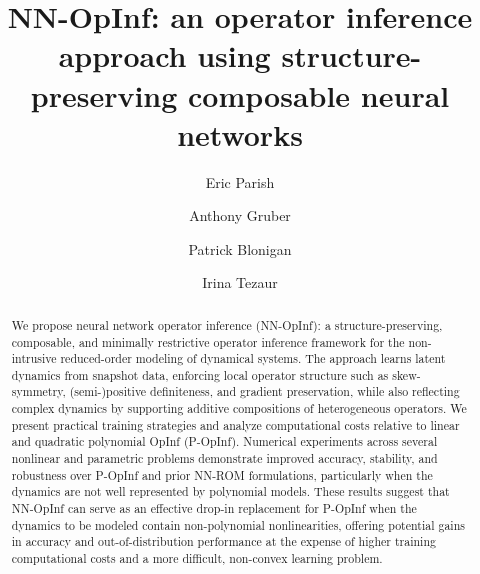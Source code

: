 \documentclass[3p,computermodern,11pt]{elsarticle}
\numberwithin{equation}{section}
\begin{document}
\begin{frontmatter}

\title{NN-OpInf: an operator inference approach using structure-preserving composable neural networks}
\author[a]{Eric Parish}
\author[b]{Anthony Gruber}
\author[a]{Patrick Blonigan}
\author[a]{Irina Tezaur}

\address[a]{Sandia National Laboratories, Livermore, CA, USA}
\address[b]{Sandia National Laboratories, Albuquerque, NM, USA}


\begin{abstract}
We propose neural network operator inference (NN-OpInf): a structure-preserving, composable, and minimally restrictive operator inference framework for the non-intrusive reduced-order modeling of dynamical systems. The approach learns latent dynamics from snapshot data, enforcing local operator structure such as skew-symmetry, (semi-)positive definiteness, and gradient preservation, while also reflecting complex dynamics by supporting additive compositions of heterogeneous operators. We present practical training strategies and analyze computational costs relative to linear and quadratic polynomial OpInf (P-OpInf). Numerical experiments across several nonlinear and parametric problems demonstrate improved accuracy, stability, and robustness over P-OpInf and prior NN-ROM formulations, particularly when the dynamics are not well represented by polynomial models.  These results suggest that NN-OpInf can serve as an effective drop-in replacement for P-OpInf when the dynamics to be modeled contain non-polynomial nonlinearities, offering potential gains in accuracy and out-of-distribution performance at the expense of higher training computational costs and a more difficult, non-convex learning problem.
\end{abstract}
\end{frontmatter}


\end{document}
